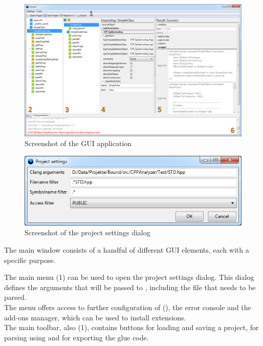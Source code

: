 \begin{figure}[h!] %
	\centering
		\includegraphics[scale=0.34]{Images/BoundGUI.png}
	\caption{Screenshot of the GUI application}
	\label{fig:BoundGUI}
\end{figure}

\begin{figure}[h!] %
	\centering
		\includegraphics[scale=0.5]{Images/ProjectSettings.png}
	\caption{Screenshot of the project settings dialog}
	\label{fig:ProjectSettings}
\end{figure}

The main window consists of a handful of different GUI elements, each with a specific purpose. 

The main menu (1) can be used to open the project settings dialog. This dialog defines the arguments that will be passed to , including the  file that needs to be parsed.\\
The  menu offers access to further configuration of  (), the  error console and the  add-ons manager, which can be used to install extensions.\\
The main toolbar, also (1), contains buttons for loading and saving a project, for parsing using  and for exporting the glue code.


